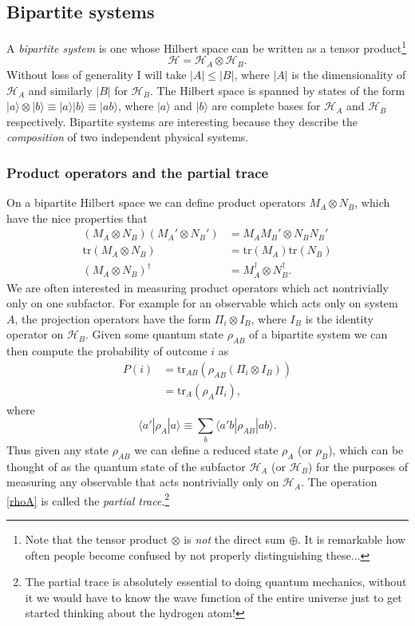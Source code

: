 \documentclass[12pt]{article}
\newcommand{\be}{\begin{equation}}
\newcommand{\ee}{\end{equation}}
\newcommand{\HA}{\mathcal{H}_A}
\newcommand{\HB}{\mathcal{H}_B}
\newcommand{\lan}{\langle}
\newcommand{\ran}{\rangle}
\newcommand{\tr}{\mathrm{tr}}
\begin{document}
\subsection{Bipartite systems}
A \textit{bipartite system} is one whose Hilbert space can be written as a tensor product\footnote{Note that the tensor product $\otimes$ is \textit{not} the direct sum $\oplus$.  It is remarkable how often people become confused by not properly distinguishing these...}
\be
\mathcal{H}=\HA\otimes \HB.
\ee
Without loss of generality I will take $|A|\leq |B|$, where $|A|$ is the dimensionality of $\HA$ and similarly $|B|$ for $\HB$.  The Hilbert space is spanned by states of the form $|a\ran\otimes |b\ran\equiv |a\ran|b\ran\equiv |ab\ran$, where $|a\ran$ and $|b\ran$ are complete bases for $\HA$ and $\HB$ respectively.  Bipartite systems are interesting because they describe the \textit{composition} of two independent physical systems. 

\subsubsection{Product operators and the partial trace}
On a bipartite Hilbert space we can define product operators $M_A\otimes N_B$, which have the nice properties that
\begin{align}\nonumber
\left(M_A\otimes N_B\right)\left(M_A'\otimes N_B'\right)&=M_AM_B'\otimes N_B N_B'\\\nonumber
\mathrm{tr}\left(M_A\otimes N_B\right)&=\mathrm{tr}\left(M_A\right) \mathrm{tr}\left(N_B\right)\\
\left(M_A\otimes N_B\right)^\dagger&=M_A^\dagger\otimes N_B^\dagger.
\end{align}
We are often interested in measuring product operators which act nontrivially only on one subfactor.  For example for an observable which acts only on system $A$, the projection operators have the form $\Pi_i\otimes I_B$, where $I_B$ is the identity operator on $\HB$.  Given some quantum state $\rho_{AB}$ of a bipartite system we can then compute the probability of outcome $i$ as
\begin{align}\nonumber
P(i)&=\mathrm{tr}_{AB}\left(\rho_{AB}\left(\Pi_i\otimes I_B\right)\right)\\
&=\tr_A\left(\rho_A \Pi_i\right),
\end{align}
where
\be\label{rhoA}
\lan a'|\rho_A|a\ran\equiv \sum_b \lan a'b|\rho_{AB}|ab\ran.
\ee
Thus given any state $\rho_{AB}$ we can define a reduced state $\rho_A$ (or $\rho_B$), which can be thought of as the quantum state of the subfactor $\HA$ (or $\HB$) for the purposes of measuring any observable that acts nontrivially only on $\HA$.  The operation \eqref{rhoA} is called the \textit{partial trace}.\footnote{The partial trace is absolutely essential to doing quantum mechanics, without it we would have to know the wave function of the entire universe just to get started thinking about the hydrogen atom!}
\end{document}
